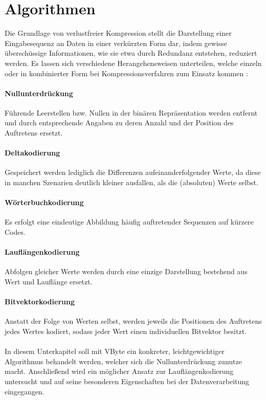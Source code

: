\section{Algorithmen}

Die Grundlage von verlustfreier Kompression stellt die Darstellung einer Eingabesequenz an Daten in einer verkürzten Form dar, indem gewisse überschüssige Informationen, wie sie etwa durch Redundanz entstehen, reduziert werden. Es lassen sich verschiedene Herangehensweisen unterteilen, welche einzeln oder in kombinierter Form bei Kompressionsverfahren zum Einsatz kommen \cite{Abadi2006}\cite{Croft2009}:

\paragraph{Nullunterdrückung}
Führende Leerstellen bzw. Nullen in der binären Repräsentation werden entfernt und durch entsprechende Angaben zu deren Anzahl und der Position des Auftretens ersetzt.

\paragraph{Deltakodierung}
Gespeichert werden lediglich die Differenzen aufeinanderfolgender Werte, da diese in manchen Szenarien deutlich kleiner ausfallen, als die (absoluten) Werte selbst.

\paragraph{Wörterbuchkodierung}
Es erfolgt eine eindeutige Abbildung häufig auftretender Sequenzen auf kürzere Codes.

\paragraph{Lauflängenkodierung}
Abfolgen gleicher Werte werden durch eine einzige Darstellung bestehend aus Wert und Lauflänge ersetzt.

\paragraph{Bitvektorkodierung}
Anstatt der Folge von Werten selbst, werden jeweils die Positionen des Auftretens jedes Wertes kodiert, sodass jeder Wert einen individuellen Bitvektor besitzt.

\paragraph{}
In diesem Unterkapitel soll mit VByte ein konkreter, leichtgewichtiger Algorithmus behandelt werden, welcher sich die Nullunterdrückung zunutze macht. Anschließend wird ein möglicher Ansatz zur Lauflängenkodierung untersucht und auf seine besonderen Eigenschaften bei der Datenverarbeitung eingegangen.

